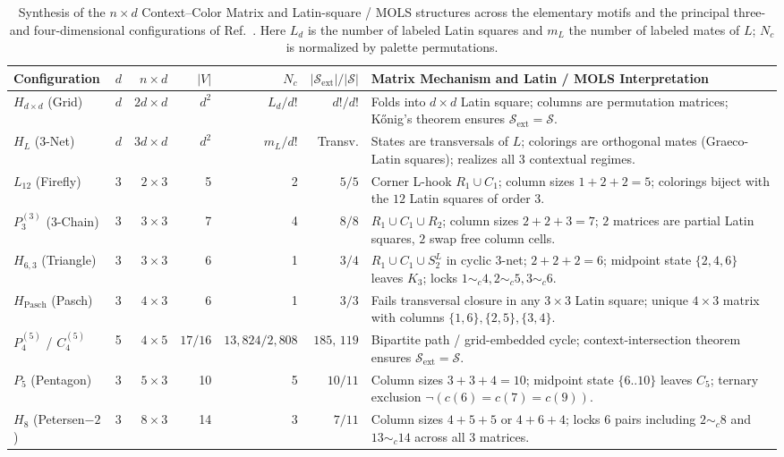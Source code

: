 \documentclass[aps,pra,reprint,superscriptaddress,longbibliography,nofootinbib,floatfix,10pt]{revtex4-2}
\theoremstyle{definition}\newtheorem{definition}[theorem]{Definition}
\theoremstyle{remark}\newtheorem{remark}[theorem]{Remark}
\newcommand{\Sc}{\mathcal S}\newcommand{\Cc}{\mathcal C}
\begin{document}
\begin{table}[t]
\centering\footnotesize\setlength{\tabcolsep}{2.5pt}
\caption{Synthesis of the $n\times d$ Context--Color Matrix and Latin-square / MOLS structures across the elementary motifs and the principal three- and four-dimensional configurations of Ref.~\cite{svozil2026contexts}. Here $L_d$ is the number of labeled Latin squares and $m_L$ the number of labeled mates of $L$; $N_c$ is normalized by palette permutations.}\label{tab:master-matrix-synthesis}
\begin{tabular}{llrrrrp{}}\toprule
Configuration & $d$ & $n\times d$ & $|V|$ & $N_c$ & $|\Sc_{\mathrm{ext}}|/|\Sc|$ & Matrix Mechanism and Latin / MOLS Interpretation\\\midrule
$H_{d\times d}$ (Grid) & $d$ & $2d\times d$ & $d^2$ & $L_d/d!$ & $d!/d!$ & Folds into $d\times d$ Latin square; columns are permutation matrices; K\H{o}nig's theorem ensures $\Sc_{\mathrm{ext}}=\Sc$.\\
$H_L$ ($3$-Net) & $d$ & $3d\times d$ & $d^2$ & $m_L/d!$ & Transv. & States are transversals of $L$; colorings are orthogonal mates (Graeco-Latin squares); realizes all $3$ contextual regimes.\\
$L_{12}$ (Firefly) & 3 & $2\times 3$ & 5 & 2 & $5/5$ & Corner L-hook $R_1\cup C_1$; column sizes $1+2+2=5$; colorings biject with the $12$ Latin squares of order $3$.\\
$P_3^{(3)}$ (3-Chain) & 3 & $3\times 3$ & 7 & 4 & $8/8$ & $R_1\cup C_1\cup R_2$; column sizes $2+2+3=7$; $2$ matrices are partial Latin squares, $2$ swap free column cells.\\
$H_{6,3}$ (Triangle) & 3 & $3\times 3$ & 6 & 1 & $3/4$ & $R_1\cup C_1\cup S_2^L$ in cyclic $3$-net; $2+2+2=6$; midpoint state $\{2,4,6\}$ leaves $K_3$; locks $1\sim_c 4,2\sim_c 5,3\sim_c 6$.\\
$H_{\mathrm{Pasch}}$ (Pasch) & 3 & $4\times 3$ & 6 & 1 & $3/3$ & Fails transversal closure in any $3\times 3$ Latin square; unique $4\times 3$ matrix with columns $\{1,6\},\{2,5\},\{3,4\}$.\\
$P_4^{(5)}$ / $C_4^{(5)}$ & 5 & $4\times 5$ & $17/16$ & $13{,}824/2{,}808$ & $185,\,119$ & Bipartite path / grid-embedded cycle; context-intersection theorem ensures $\Sc_{\mathrm{ext}}=\Sc$.\\
$P_5$ (Pentagon) & 3 & $5\times 3$ & 10 & 5 & $10/11$ & Column sizes $3+3+4=10$; midpoint state $\{6..10\}$ leaves $C_5$; ternary exclusion $\neg(c(6)=c(7)=c(9))$.\\
$H_8$ (Petersen$-2$) & 3 & $8\times 3$ & 14 & 3 & $7/11$ & Column sizes $4+5+5$ or $4+6+4$; locks $6$ pairs including $2\sim_c 8$ and $13\sim_c 14$ across all $3$ matrices.\\

\end{tabular}
\end{table}
\end{document}
